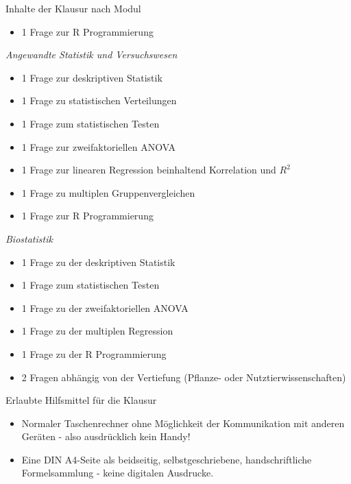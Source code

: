 \documentclass[a4paper, 10pt]{scrartcl}\usepackage[]{graphicx}\usepackage[]{xcolor}
\begin{document}
\begin{graybox}{Inhalte der Klausur nach Modul}
\begin{itemize}
  \item 1 Frage zur R Programmierung
  \end{itemize} 
  \textit{Angewandte Statistik und Versuchswesen} 
  \begin{itemize}
  \item 1 Frage zur deskriptiven Statistik
  \item 1 Frage zu statistischen Verteilungen
  \item 1 Frage zum statistischen Testen
  \item 1 Frage zur zweifaktoriellen ANOVA
  \item 1 Frage zur linearen Regression beinhaltend Korrelation und $R^2$
  \item 1 Frage zu multiplen Gruppenvergleichen
  \item 1 Frage zur R Programmierung
  \end{itemize} 
  \textit{Biostatistik}
  \begin{itemize}
  \item 1 Frage zu der deskriptiven Statistik
  \item 1 Frage zum statistischen Testen
  \item 1 Frage zu der zweifaktoriellen ANOVA
  \item 1 Frage zu der multiplen Regression
  \item 1 Frage zu der R Programmierung
  \item 2 Fragen abhängig von der Vertiefung (Pflanze- oder Nutztierwissenschaften)
  \end{itemize} 
\end{graybox}
  

\begin{graybox}{Erlaubte Hilfsmittel für die Klausur}
  \vspace{1Ex}
  \begin{itemize}
  \item Normaler Taschenrechner ohne Möglichkeit der Kommunikation mit anderen
    Geräten - also ausdrücklich kein Handy!
  \item Eine DIN A4-Seite als beidseitig, selbstgeschriebene,
    handschriftliche Formelsammlung - keine digitalen Ausdrucke. 
  \end{itemize}
\end{graybox}
\vfill
\end{document}
